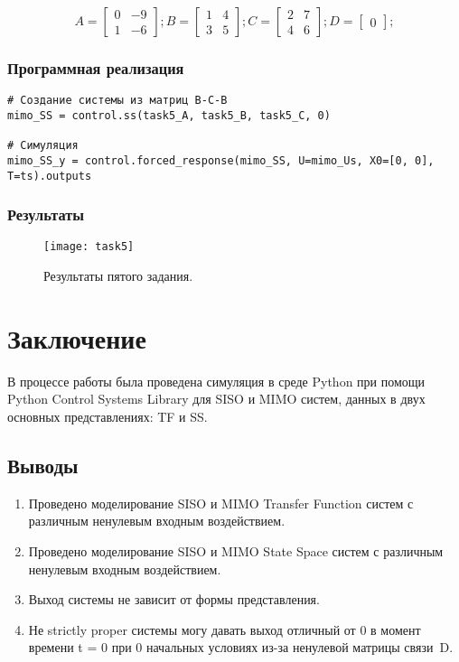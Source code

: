 \documentclass[16pt]{article}
\begin{document}
\[ 
    A = \begin{bmatrix}
        0 &  -9 \\
        1 &  -6 
        \end{bmatrix};
        B = \begin{bmatrix}
            1 & 4 \\
            3 & 5
            \end{bmatrix};
        C = \begin{bmatrix}
            2 & 7 \\
            4 & 6
            \end{bmatrix};
        D = \begin{bmatrix}
            0
            \end{bmatrix};
\]

\subsubsection{Программная реализация}
\begin{verbatim}
# Создание системы из матриц В-С-В
mimo_SS = control.ss(task5_A, task5_B, task5_C, 0)

# Симуляция
mimo_SS_y = control.forced_response(mimo_SS, U=mimo_Us, X0=[0, 0], T=ts).outputs
\end{verbatim}

\subsubsection{Результаты}
\begin{figure}[H]
	\centering
	\texttt{[image: task5]}
	\caption{Результаты пятого задания.}
	\label{fig:fig5}
\end{figure}

\newpage
\section{Заключение}
В процессе работы была проведена симуляция в среде Python при помощи Python Control Systems Library для SISO и MIMO систем, данных в двух основных представлениях: TF и SS.
\subsection{Выводы}
\begin{enumerate}
   \item Проведено моделирование SISO и MIMO Transfer Function систем с различным ненулевым входным воздействием.
   \item Проведено моделирование SISO и MIMO State Space систем с различным ненулевым входным воздействием.
   \item Выход системы не зависит от формы представления.
   \item Не strictly proper системы могу давать выход отличный от 0 в момент времени t = 0 при 0 начальных условиях из-за ненулевой матрицы связи~D. 
\end{enumerate}
\end{document}
